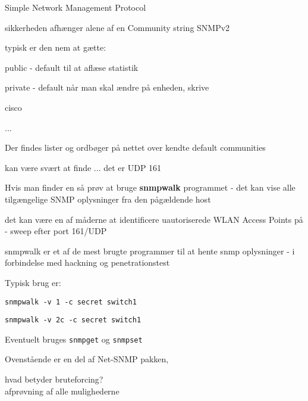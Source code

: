 \documentclass[Screen16to9,17pt]{foils}
\begin{document}
\begin{list1}
\item Simple Network Management Protocol
\item sikkerheden afhænger alene af en Community string SNMPv2
\item typisk er den nem at gætte:
  \begin{list2}
    \item public - default til at aflæse statistik
\item private - default når man skal ændre på enheden, skrive
\item cisco
\item ...
  \end{list2}
\item Der findes lister og ordbøger på nettet over kendte default communities
\end{list1}


\begin{list1}
  \item kan være svært at finde ... det er UDP 161
\item Hvis man finder en så prøv at bruge {\bfseries snmpwalk}
  programmet - det kan vise alle tilgængelige SNMP oplysninger fra den
  pågældende host
\item det kan være en af måderne at identificere uautoriserede WLAN
  Access Points på - sweep efter port 161/UDP
\item snmpwalk er et af de mest brugte programmer til at hente snmp
  oplysninger - i forbindelse med hackning og penetrationstest
\end{list1}


\begin{list1}
\item Typisk brug er:
\item \verb+snmpwalk -v 1 -c secret switch1+
\item \verb+snmpwalk -v 2c -c secret switch1+
\item Eventuelt bruges \verb+snmpget+ og \verb+snmpset+
\item Ovenstående er en del af Net-SNMP pakken, 
\end{list1}



\begin{list1}
\item hvad betyder bruteforcing?\\
afprøvning af alle mulighederne
\end{list1}
\end{document}
